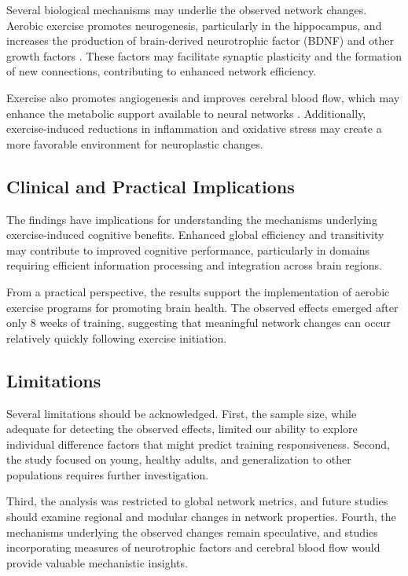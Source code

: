 \documentclass[12pt,a4paper]{article}
\begin{document}
Several biological mechanisms may underlie the observed network changes. Aerobic exercise promotes neurogenesis, particularly in the hippocampus, and increases the production of brain-derived neurotrophic factor (BDNF) and other growth factors \citep{Voss2013}. These factors may facilitate synaptic plasticity and the formation of new connections, contributing to enhanced network efficiency.

Exercise also promotes angiogenesis and improves cerebral blood flow, which may enhance the metabolic support available to neural networks \citep{Swain2003}. Additionally, exercise-induced reductions in inflammation and oxidative stress may create a more favorable environment for neuroplastic changes.

\subsection{Clinical and Practical Implications}

The findings have implications for understanding the mechanisms underlying exercise-induced cognitive benefits. Enhanced global efficiency and transitivity may contribute to improved cognitive performance, particularly in domains requiring efficient information processing and integration across brain regions.

From a practical perspective, the results support the implementation of aerobic exercise programs for promoting brain health. The observed effects emerged after only 8 weeks of training, suggesting that meaningful network changes can occur relatively quickly following exercise initiation.

\subsection{Limitations}

Several limitations should be acknowledged. First, the sample size, while adequate for detecting the observed effects, limited our ability to explore individual difference factors that might predict training responsiveness. Second, the study focused on young, healthy adults, and generalization to other populations requires further investigation.

Third, the analysis was restricted to global network metrics, and future studies should examine regional and modular changes in network properties. Fourth, the mechanisms underlying the observed changes remain speculative, and studies incorporating measures of neurotrophic factors and cerebral blood flow would provide valuable mechanistic insights.
\end{document}
